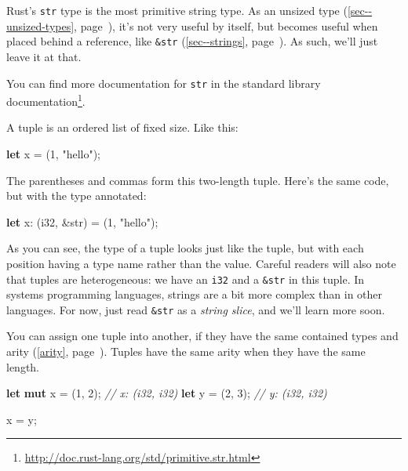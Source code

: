 \documentclass[a4paper,]{book}
\renewcommand*{\hyperref}[2][\ar]{%
  \def\ar{#2}%
  #2 (\autoref{#1}, page~\pageref{#1})}
\newenvironment{Shaded}{\begin{snugshade}}{\end{snugshade}}
\newcommand{\KeywordTok}[1]{\textcolor[rgb]{0.13,0.29,0.53}{\textbf{{#1}}}}
\newcommand{\DataTypeTok}[1]{\textcolor[rgb]{0.13,0.29,0.53}{{#1}}}
\newcommand{\DecValTok}[1]{\textcolor[rgb]{0.00,0.00,0.81}{{#1}}}
\newcommand{\StringTok}[1]{\textcolor[rgb]{0.31,0.60,0.02}{{#1}}}
\newcommand{\CommentTok}[1]{\textcolor[rgb]{0.56,0.35,0.01}{\textit{{#1}}}}
\newcommand{\NormalTok}[1]{{#1}}
\renewcommand{\href}[2]{#2\footnote{\url{#1}}}
\begin{document}
Rust's \texttt{str} type is the most primitive string type. As an
\hyperref[sec--unsized-types]{unsized type}, it's not very useful by
itself, but becomes useful when placed behind a reference, like
\hyperref[sec--strings]{\texttt{\&str}}. As such, we'll just leave it at
that.

You can find more documentation for \texttt{str}
\href{http://doc.rust-lang.org/std/primitive.str.html}{in the standard
library documentation}.


A tuple is an ordered list of fixed size. Like this:

\begin{Shaded}
\begin{Highlighting}[]
\KeywordTok{let} \NormalTok{x = (}\DecValTok{1}\NormalTok{, }\StringTok{"hello"}\NormalTok{);}
\end{Highlighting}
\end{Shaded}

The parentheses and commas form this two-length tuple. Here's the same
code, but with the type annotated:

\begin{Shaded}
\begin{Highlighting}[]
\KeywordTok{let} \NormalTok{x: (}\DataTypeTok{i32}\NormalTok{, &}\DataTypeTok{str}\NormalTok{) = (}\DecValTok{1}\NormalTok{, }\StringTok{"hello"}\NormalTok{);}
\end{Highlighting}
\end{Shaded}

As you can see, the type of a tuple looks just like the tuple, but with
each position having a type name rather than the value. Careful readers
will also note that tuples are heterogeneous: we have an \texttt{i32}
and a \texttt{\&str} in this tuple. In systems programming languages,
strings are a bit more complex than in other languages. For now, just
read \texttt{\&str} as a \emph{string slice}, and we'll learn more soon.

You can assign one tuple into another, if they have the same contained
types and \hyperref[arity]{arity}. Tuples have the same arity when they
have the same length.

\begin{Shaded}
\begin{Highlighting}[]
\KeywordTok{let} \KeywordTok{mut} \NormalTok{x = (}\DecValTok{1}\NormalTok{, }\DecValTok{2}\NormalTok{); }\CommentTok{// x: (i32, i32)}
\KeywordTok{let} \NormalTok{y = (}\DecValTok{2}\NormalTok{, }\DecValTok{3}\NormalTok{); }\CommentTok{// y: (i32, i32)}

\NormalTok{x = y;}
\end{Highlighting}
\end{Shaded}
\end{document}
